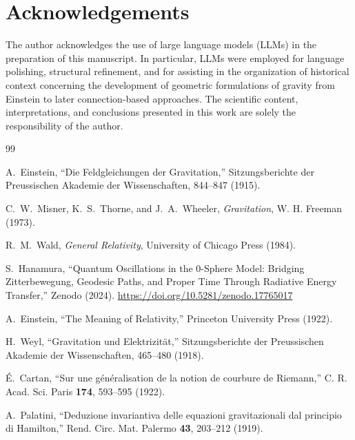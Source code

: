 \documentclass[%
 reprint,
 amsmath,amssymb,
 aps,
 prb,
]{revtex4-2}
\numberwithin{equation}{section}
\begin{document}
\section*{Acknowledgements}

The author acknowledges the use of large language models (LLMs) in the preparation of this manuscript. In particular, LLMs were employed for language polishing, structural refinement, and for assisting in the organization of historical context concerning the development of geometric formulations of gravity from Einstein to later connection-based approaches. The scientific content, interpretations, and conclusions presented in this work are solely the responsibility of the author.

\clearpage  %

\begin{thebibliography}{99}

A.~Einstein,
``Die Feldgleichungen der Gravitation,''
Sitzungsberichte der Preussischen Akademie der Wissenschaften, 844--847 (1915).

C.~W.~Misner, K.~S.~Thorne, and J.~A.~Wheeler,
\textit{Gravitation},
W. H. Freeman (1973).

R.~M.~Wald,
\textit{General Relativity},
University of Chicago Press (1984).

S.~Hanamura,
``Quantum Oscillations in the 0-Sphere Model: Bridging Zitterbewegung, Geodesic Paths, and Proper Time Through Radiative Energy Transfer,''
Zenodo (2024).
\href{https://doi.org/10.5281/zenodo.17765017}{https://doi.org/10.5281/zenodo.17765017}

A.~Einstein,
``The Meaning of Relativity,''
Princeton University Press (1922).

H.~Weyl,
``Gravitation und Elektrizit{\"a}t,''
Sitzungsberichte der Preussischen Akademie der Wissenschaften, 465--480 (1918).

{\'E}.~Cartan,
``Sur une g{\'e}n{\'e}ralisation de la notion de courbure de Riemann,''
C. R. Acad. Sci. Paris \textbf{174}, 593--595 (1922).

A.~Palatini,
``Deduzione invariantiva delle equazioni gravitazionali dal principio di Hamilton,''
Rend. Circ. Mat. Palermo \textbf{43}, 203--212 (1919).


\end{thebibliography}
\end{document}
